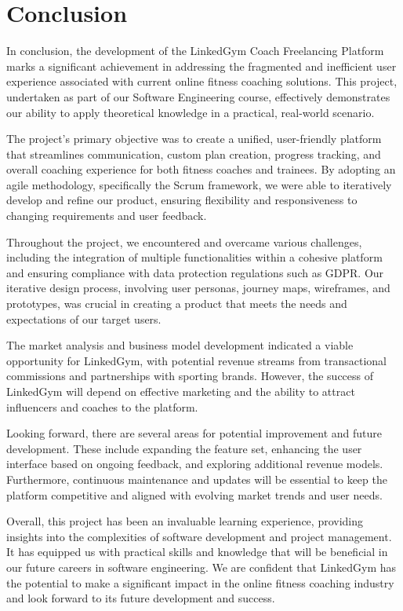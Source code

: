 \section{Conclusion}

In conclusion, the development of the LinkedGym Coach Freelancing Platform marks a significant achievement in addressing the fragmented and inefficient user experience associated with current online fitness coaching solutions. This project, undertaken as part of our Software Engineering course, effectively demonstrates our ability to apply theoretical knowledge in a practical, real-world scenario. 

The project's primary objective was to create a unified, user-friendly platform that streamlines communication, custom plan creation, progress tracking, and overall coaching experience for both fitness coaches and trainees. By adopting an agile methodology, specifically the Scrum framework, we were able to iteratively develop and refine our product, ensuring flexibility and responsiveness to changing requirements and user feedback.

Throughout the project, we encountered and overcame various challenges, including the integration of multiple functionalities within a cohesive platform and ensuring compliance with data protection regulations such as GDPR. Our iterative design process, involving user personas, journey maps, wireframes, and prototypes, was crucial in creating a product that meets the needs and expectations of our target users.

The market analysis and business model development indicated a viable opportunity for LinkedGym, with potential revenue streams from transactional commissions and partnerships with sporting brands. However, the success of LinkedGym will depend on effective marketing and the ability to attract influencers and coaches to the platform.

Looking forward, there are several areas for potential improvement and future development. These include expanding the feature set, enhancing the user interface based on ongoing feedback, and exploring additional revenue models. Furthermore, continuous maintenance and updates will be essential to keep the platform competitive and aligned with evolving market trends and user needs.

Overall, this project has been an invaluable learning experience, providing insights into the complexities of software development and project management. It has equipped us with practical skills and knowledge that will be beneficial in our future careers in software engineering. We are confident that LinkedGym has the potential to make a significant impact in the online fitness coaching industry and look forward to its future development and success.


\clearpage
